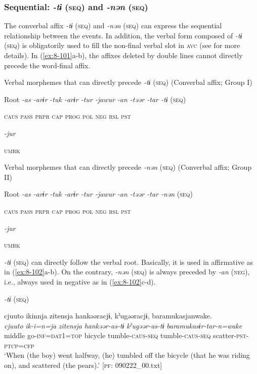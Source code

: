 \subsubsection{Sequential: \textit{-tɨ} (\textsc{seq}) and \textit{-nən} (\textsc{seq})}

The converbal affix \textit{-tɨ} (\textsc{seq}) and \textit{-nən} (\textsc{seq}) can express the sequential relationship between the events. In addition, the verbal form composed of \textit{-tɨ} (\textsc{seq}) is obligatorily used to fill the non-final verbal slot in \textsc{avc} (see  for more details). In (\ref{ex:8-101}a-b), the affixes deleted by double lines cannot directly precede the word-final affix.

\ea\label{ex:8-101}
\ea Verbal morphemes that can directly precede \textit{-tɨ} (\textsc{seq}) (Converbal affix; Group I)

  Root  \textit{-as  -arɨr} %
\textit{-tuk  -arɨr  -tur  -jawur} %
\textit{-an  -təər  -tar  -tɨ} (\textsc{seq})

    \textsc{caus}  \textsc{pass}  \textsc{prpr}  \textsc{cap}  \textsc{prog}  \textsc{pol}  \textsc{neg}  \textsc{rsl}  \textsc{pst}

          \textit{-jur}

          \textsc{umrk}
\z


\ex Verbal morphemes that can directly precede \textit{-nən} (\textsc{seq}) (Converbal affix; Group II)

  Root  \textit{-as  -arɨr} %
\textit{-tuk  -arɨr  -tur  -jawur} %
\textit{-an  -təər  -tar  -nən} (\textsc{seq})

    \textsc{caus}  \textsc{pass}  \textsc{prpr}  \textsc{cap}  \textsc{prog}  \textsc{pol}  \textsc{neg}  \textsc{rsl}  \textsc{pst}

          \textit{-jur}

          \textsc{umrk}
\z

\textit{-tɨ} (\textsc{seq}) can directly follow the verbal root. Basically, it is used in affirmative as in (\ref{ex:8-102}a-b). On the contrary, \textit{-nən} (\textsc{seq}) is always preceded by \textit{-an} (\textsc{neg}), i.e., always used in negative as in (\ref{ex:8-102}c-d).

\ea\label{ex:8-102}
  \textit{-tɨ} (\textsc{seq})

\ea
{\TM}
\glll  cjuuto  ikinnja  {\textbar}zitensja{\textbar}  hankəəracjɨ,      kˀugəəracjɨ,  baramukasjanwake.
\\
\textit{cjuuto}  \textit{ik-i=n=ja}  \textit{zitensja}  \textit{hankəər-as-tɨ}      \textit{kˀugəər-as-tɨ}  \textit{baramukasɨr-tar-n=wake}\\
middle  go-\textsc{inf}=\textsc{dat1}=\textsc{top}  bicycle  tumble-\textsc{caus}-\textsc{seq}  tumble-\textsc{caus}-\textsc{seq}  scatter-\textsc{pst}-\textsc{ptcp}=\textsc{cfp}\\
\glt ‘When (the boy) went halfway, (he) tumbled off the bicycle (that he was riding on), and scattered (the pears).’ [\textsc{pf}: 090222\_00.txt]

